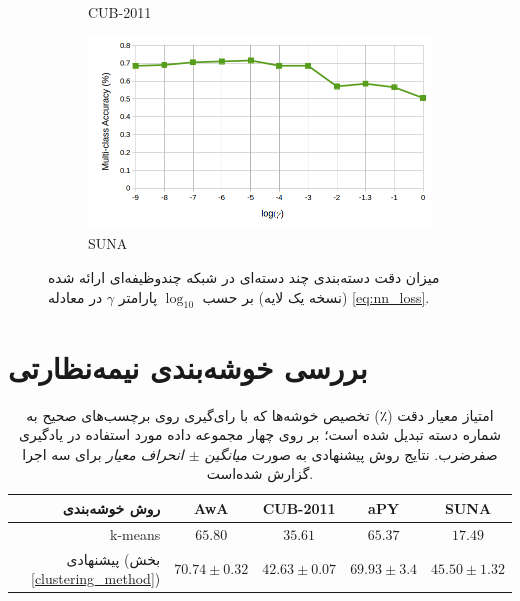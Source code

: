 \begin{figure}[!th]
\begin{subfigure}[b]{0.43\linewidth}
    \caption{CUB-2011}
\end{subfigure}
\begin{subfigure}[b]{0.43\linewidth}
    \includegraphics[width=\linewidth]{images/nn_param_sun}
    \caption{SUNA}
\end{subfigure}
\caption[نمودار تحلیل فراپامتر شبکه عصبی]{
میزان دقت دسته‌بندی چند دسته‌ای در شبکه چندوظیفه‌ای ارائه شده (نسخه یک لایه) بر حسب $\log_{10}$ پارامتر $\gamma$ در معادله
\eqref{eq:nn_loss}.
}
\label{fig:nn_param}
\end{figure}




\section{بررسی خوشه‌بندی نیمه‌نظارتی}\label{exp:cluster}
\begin{table}[ht]
\centering
\caption[بررسی عمل‌کرد خوشه‌بندی نیمه‌نظارتی پیشنهاتی]{
امتیاز معیار دقت (٪) تخصیص خوشه‌ها که با رای‌گیری روی برچسب‌های صحیح به شماره دسته تبدیل شده است؛ بر روی چهار مجموعه داده مورد استفاده در یادگیری صفرضرب. نتایج روش پیشنهادی به صورت
\textit{ میانگین $\pm$ انحراف معیار }
برای سه اجرا گزارش شده‌است.}
\vspace*{2mm}
  \label{tab:clustering}
\begin{tabular}{|r|c|c|c|c|}
\hline
روش خوشه‌بندی & AwA & CUB-2011 & aPY & SUNA \\
\hline
k-means                             &  ${65.80}$                 & ${35.61}$           & ${65.37 }$               & ${17.49 }$   \\
\hline
پیشنهادی (بخش \ref{clustering_method})
                      & \textbf{${70.74\pm 0.32}$}  & \textbf{${42.63\pm 0.07}$} & \textbf{${69.93\pm 3.4}$} & \textbf{ ${45.50 \pm 1.32}$} \\
\hline
\end{tabular}
\vspace{2mm}
\end{table}

